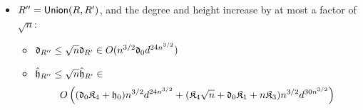 \documentclass[12pt]{article}
\def\fd{\frak{d}}
\def\fh{\frak{h}}
\def\fhh{\hat{\frak{h}}}
\def\fK{\frak{K}}
\def\Union{{\sf Union}}
\begin{document}
\begin{itemize}
\begin{proof}
\begin{enumerate}
\[    \]
    Now our index $j$ is at most $\sqrt{n}$:
    \[
    \fd_{R'} \leq n\frak{d}_0\fK^{\sqrt{n}+1}\fK^{n-s-e+1}.
    \]
    Substitute $\fK=(2d^{6n}+d^{2n}+1)\leq 4d^{6n}$ gives
    \[
    \fd_{R'} \leq n\frak{d}_0(4d^{6n})^{\sqrt{n}+1}(4d^{6n})^{n-s-e+1}.
    \]
    Given that $s=n-e-\sqrt{n}$:
    \[
    \fd_{R'} \in O(n\frak{d}_0(d^{6n})^{\sqrt{n}+1}(d^{6n})^{\sqrt{n}+1})
    \]
    Therefore 
    \[
    \fd_{R'} \in O(n\frak{d}_0d^{12n^{3/2}+12n}) \in O(n\frak{d}_0d^{24n^{3/2}})
    \]
\item Immediately from Proposition \ref{prop:CannyComplexity}, using \[n-s-e = n-(n-e-\sqrt{n})-e = \sqrt{n},\] we obtain 
\[
n(\fK^{\sqrt{n}+2}\fK_3n+\fK^{\sqrt{n}+1}(\hat{h}_0+d_0\fK_1d^{2n})+\fK_4d_0\fK^{\sqrt{n}+1})
\]
Substitute $d_0\leq \fd_0\fK^{j+1}$:
\[
n(\fK^{\sqrt{n}+2}\fK_3n+\fK^{\sqrt{n}+1}(\hat{h}_0+\frak{d}_0\fK^{j+1}\fK_1d^{2n})+\fK_4\frak{d}_0\fK^{j+1}\fK^{\sqrt{n}+1})
\]
substitute $\hat{\fh}_0 \leq \fK^{j+2}\fK_4(j+1)+\hat{\fh}_0\fK^{j+1}$:
\[
n(\fK^{\sqrt{n}+2}\fK_3n+\fK^{\sqrt{n}+1}((\fK^{j+2}\fK_4(j+1)+\fhh_0\fK^{j+1})+\frak{d}_0\fK^{j+1}\fK_1d^{2n})+\fK_4\frak{d}_0\fK^{j+1}K^{\sqrt{n}+1})
\]
Substitute $j\leq \sqrt{n}$:
\[
n(\fK^{\sqrt{n}+2}\fK_3n+\fK^{\sqrt{n}+1}((\fK^{\sqrt{n}+2}\fK_4(\sqrt{n}+1)+\fhh_0\fK^{\sqrt{n}+1})+\frak{d}_0\fK^{\sqrt{n}+1}\fK_1d^{2n})+\fK_4\frak{d}_0\fK^{\sqrt{n}+1}\fK^{\sqrt{n}+1})
\]
Now finally substitute $\fK \leq 4d^{6n}$ and consider the asymptotic behavior to obtain the conclusion. 
\end{enumerate}

\end{proof}







\item $R'' = \Union(R,R')$, and the degree and height increase by at most a factor of $\sqrt{n}:$ 
\begin{itemize}
    \item $\fd_{R''}\leq \sqrt{n} \fd_{R'} \in 
        O(n^{3/2}\frak{d}_0d^{24n^{3/2}})$
    \item $\hat{\fh}_{R''} \leq \sqrt{n} \hat{\fh}_{R'} \in$
        \[
    O\left((\frak{d}_0\fK_4+\frak{h}_0)n^{3/2}d^{24n^{3/2}} + (\fK_4\sqrt{n}+\frak{d}_0\fK_1+n\fK_3)n^{3/2}d^{30n^{3/2}}\right)
    \]
\end{itemize}


\end{itemize}
\end{document}

